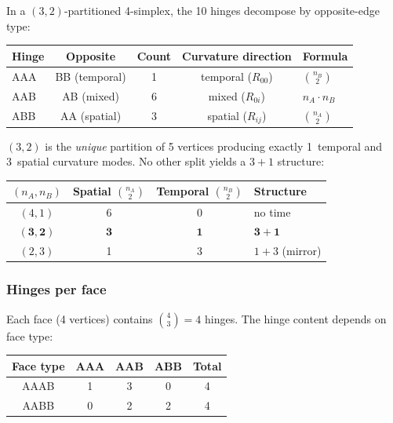 \begin{theorem}
\label{thm:opposite}
In a $(3,2)$-partitioned 4-simplex, the 10 hinges decompose by opposite-edge type:
\begin{center}
\begin{tabular}{lcccl}
\toprule
Hinge & Opposite & Count & Curvature direction & Formula \\
\midrule
AAA & BB (temporal) & 1 & temporal ($R_{00}$) & $\binom{n_B}{2}$ \\
AAB & AB (mixed)    & 6 & mixed ($R_{0i}$)    & $n_A \cdot n_B$ \\
ABB & AA (spatial)  & 3 & spatial ($R_{ij}$)   & $\binom{n_A}{2}$ \\
\bottomrule
\end{tabular}
\end{center}
\end{theorem}

\begin{corollary}
\label{cor:31_spacetime}
$(3,2)$ is the \emph{unique} partition of 5 vertices producing exactly 1~temporal and 3~spatial curvature modes.  No other split yields a $3+1$ structure:

\begin{center}
\begin{tabular}{cccl}
\toprule
$(n_A,n_B)$ & Spatial $\binom{n_A}{2}$ & Temporal $\binom{n_B}{2}$ & Structure \\
\midrule
$(4,1)$ & 6 & 0 & no time \\
$\mathbf{(3,2)}$ & $\mathbf{3}$ & $\mathbf{1}$ & $\boldsymbol{3+1}$ \\
$(2,3)$ & 1 & 3 & $1+3$ (mirror) \\
\bottomrule
\end{tabular}
\end{center}
\end{corollary}

\subsubsection{Hinges per face}

Each face (4 vertices) contains $\binom{4}{3} = 4$ hinges. The hinge content depends on face type:

\begin{center}
\begin{tabular}{ccccc}
\hline
Face type & AAA & AAB & ABB & Total \\
\hline
AAAB & 1 & 3 & 0 & 4 \\
AABB & 0 & 2 & 2 & 4 \\
\hline
\end{tabular}
\end{center}

